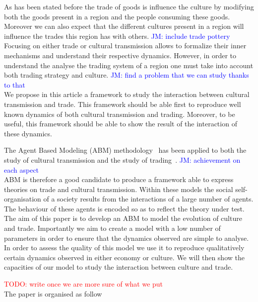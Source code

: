 \documentclass{wscpaperproc}
\newcommand{\memo}[2]{\textcolor{#1}{#2}}
\newcommand{\todo}[1]{\memo{red}{TODO: #1\\}}
\newcommand{\jm}[1]{\memo{blue}{JM: #1\\}}
\begin{document}
As has been stated before the trade of goods is influence the culture by modifying both the goods present in a region and the people consuming these goods. Moreover we can also expect that the different cultures present in a region will influence the trades this region has with others. \jm{include trade pottery} Focusing on either trade or cultural transmission allows to formalize their inner mechanisms and understand their respective dynamics. However, in order to understand the analyse the trading system of a region one must take into account both trading strategy and culture. \jm{find a problem that we can study thanks to that}
We propose in this article a framework to study the interaction between cultural transmission and trade. This framework should be able first to reproduce well known dynamics of both cultural transmission and trading. Moreover, to be useful, this framework should be able to show the result of the interaction of these dynamics.


The Agent Based Modeling (ABM) methodology~\cite{} has been applied to both the study of cultural transmission and the study of trading~\cite{}. \jm{achievement on each aspect} ABM is therefore a good candidate to produce a framework able to express theories on trade and cultural transmission. Within these models the social self-organisation of a society results from the interactions of a large number of agents. The behaviour of these agents is encoded so as to reflect the theory under test.
The aim of this paper is to develop an ABM to model the evolution of culture and trade. Importantly we aim to create a model with a low number of parameters in order to ensure that the dynamics observed are simple to analyse. In order to assess the quality of this model we use it to reproduce qualitatively certain dynamics observed in either economy or culture. We will then show the capacities of our model to study the interaction between culture and trade.




\todo{write once we are more sure of what we put}
The paper is organised as follow
\end{document}

